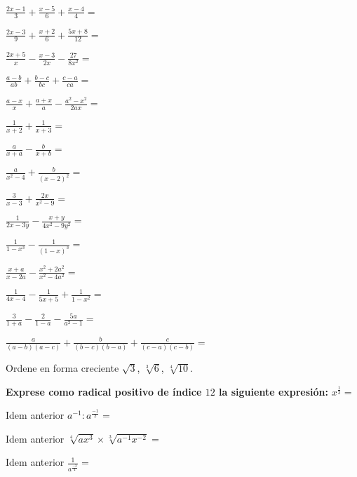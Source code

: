 \documentclass[12pt,addpoints,x11names]{exam}
\begin{document}
\begin{questions}

  \begin{multicols}{2}
    \question $\frac{2x-1}{3}+\frac{x-5}{6}+\frac{x-4}{4}=$
    
    \question $\frac{2x-3}{9}+\frac{x+2}{6}+\frac{5x+8}{12}=$
    
    \question $\frac{2x+5}{x}-\frac{x-3}{2x}-\frac{27}{8x^2}=$
    
    \question $\frac{a-b}{ab}+\frac{b-c}{bc}+\frac{c-a}{ca}=$
    
    \question $\frac{a-x}{x}+\frac{a+x}{a}-\frac{a^2-x^2}{2ax}=$

    \question $\frac{1}{x+2}+\frac{1}{x+3}=$

    \question $\frac{a}{x+a}-\frac{b}{x+b}=$

    \question $\frac{a}{x^2-4}+\frac{b}{(x-2)^2}=$

    \question $\frac{3}{x-3}+\frac{2x}{x^2-9}=$

    \question $\frac{1}{2x-3y}-\frac{x+y}{4x^2-9y^2}=$

    \question $\frac{1}{1-x^3}-\frac{1}{(1-x)^3}=$

    \question $\frac{x+a}{x-2a}-\frac{x^2+2a^2}{x^2-4a^2}=$

    \question $\frac{1}{4x-4}-\frac{1}{5x+5}+\frac{1}{1-x^2}=$

    \question $\frac{3}{1+a}-\frac{2}{1-a}-\frac{5a}{a^2-1}=$

    \question $\frac{a}{(a-b)(a-c)}+\frac{b}{(b-c)(b-a)}+\frac{c}{(c-a)(c-b)}=$

\end{multicols}


\begin{multicols}{2}
  
    \question Ordene en forma creciente $\sqrt{3}$, $\sqrt[3]{6}$,
      $\sqrt[4]{10}$.
      
    \question \textbf{Exprese como radical positivo de índice $12$ la siguiente expresión:} $x^{\frac{1}{3}}=$

    \question Idem anterior $a^{-1}:a^{\frac{-1}{2}}=$

    \question Idem anterior $\sqrt[4]{ax^3}\times\sqrt[3]{a^{-1}x^{-2}}=$
      
    \question Idem anterior $\frac{1}{a^{\frac{-3}{4}}}=$


\end{multicols}
\end{questions}
\end{document}
